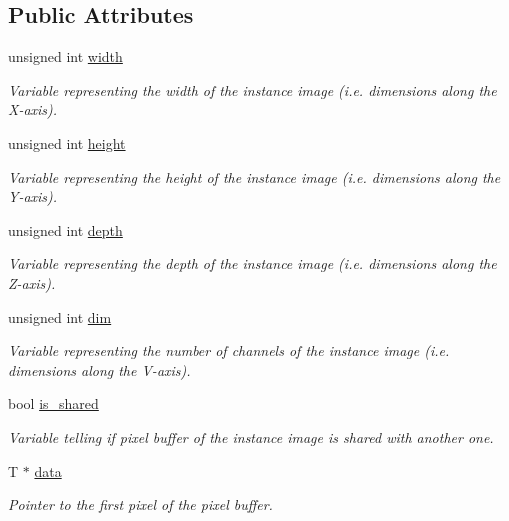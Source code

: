\subsection*{Public Attributes}
\begin{DoxyCompactItemize}
\item 
unsigned int \hyperlink{structcimg__library_1_1_c_img_a5fb74a7776210bb99fd6755319ade13f}{width}
\begin{DoxyCompactList}\small\item\em Variable representing the width of the instance image (i.\-e. dimensions along the X-\/axis). \end{DoxyCompactList}\item 
unsigned int \hyperlink{structcimg__library_1_1_c_img_a30d575fd18ae525e507315de71b4806a}{height}
\begin{DoxyCompactList}\small\item\em Variable representing the height of the instance image (i.\-e. dimensions along the Y-\/axis). \end{DoxyCompactList}\item 
unsigned int \hyperlink{structcimg__library_1_1_c_img_a982d5d1e153477adf7f851106fe8ee3a}{depth}
\begin{DoxyCompactList}\small\item\em Variable representing the depth of the instance image (i.\-e. dimensions along the Z-\/axis). \end{DoxyCompactList}\item 
unsigned int \hyperlink{structcimg__library_1_1_c_img_ac9648dfe0a26d58e6e0030a3dbca234e}{dim}
\begin{DoxyCompactList}\small\item\em Variable representing the number of channels of the instance image (i.\-e. dimensions along the V-\/axis). \end{DoxyCompactList}\item 
\hypertarget{structcimg__library_1_1_c_img_a324b08e7f83d22a0166f2e4571d61543}{bool \hyperlink{structcimg__library_1_1_c_img_a324b08e7f83d22a0166f2e4571d61543}{is\-\_\-shared}}\label{structcimg__library_1_1_c_img_a324b08e7f83d22a0166f2e4571d61543}

\begin{DoxyCompactList}\small\item\em Variable telling if pixel buffer of the instance image is shared with another one. \end{DoxyCompactList}\item 
\hypertarget{structcimg__library_1_1_c_img_a54f252b86f19b2217aef3ec9e1e2e013}{T $\ast$ \hyperlink{structcimg__library_1_1_c_img_a54f252b86f19b2217aef3ec9e1e2e013}{data}}\label{structcimg__library_1_1_c_img_a54f252b86f19b2217aef3ec9e1e2e013}

\begin{DoxyCompactList}\small\item\em Pointer to the first pixel of the pixel buffer. \end{DoxyCompactList}\end{DoxyCompactItemize}
